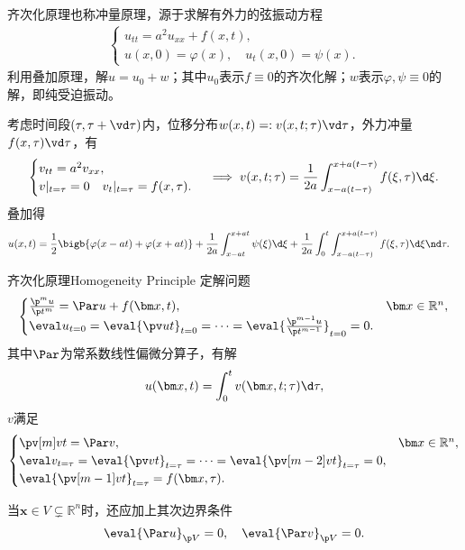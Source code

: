齐次化原理也称冲量原理，源于求解有外力的弦振动方程
\begin{align*}
	\begin{cases}
		u_{tt}=a^2u_{xx}+f(x,t),\\
		u(x,0)=\varphi(x),\quad u_t(x,0)=\psi(x).
	\end{cases}
\end{align*}
利用叠加原理，解$u=u_0+w$；其中$u_0$表示$f\equiv 0$的齐次化解；$w$表示$\varphi,\psi\equiv 0$的解，即纯受迫振动。

考虑时间段$(\tau,\tau+\vd\tau)$内，位移分布$w(x,t)=:v(x,t;\tau)\vd\tau$，外力冲量$f(x,\tau)\vd\tau$，有
\begin{align*}
	\begin{cases}
			v_{tt}=a^2v_{xx},\\
			v|_{t=\tau}=0\quad v_t|_{t=\tau}=f(x,\tau).
	\end{cases}\implies v(x,t;\tau)=\frac1{2a}\int_{x-a(t-\tau)}^{x+a(t-\tau)}f(\xi,\tau)\d\xi.
\end{align*}
叠加得
\begin{align}
	\begin{aligned}
		u(x,t)= {}&\frac12\bigb{\varphi(x-at)+\varphi(x+at)}+\frac1{2a}\int_{x-at}^{x+at}\psi(\xi)\d\xi+\frac1{2a}\int_0^t\int_{x-a(t-\tau)}^{x+a(t-\tau)}f(\xi,\tau)\d\xi\nd\tau.
	\end{aligned}
\end{align}
\begin{theorem}{齐次化原理}{Homogeneity Principle}
	定解问题
	\begin{align*}
		\begin{cases}
			\frac{\p^mu}{\p t^m}=\Par u+f(\bm x,t),&\bm x\in\mathbb R^n,\\
			\eval u_{t=0}=\eval{\pv ut}_{t=0}=\cdots=\eval{\frac{\p^{m-1}u}{\p t^{m-1}}}_{t=0}=0.
		\end{cases}
	\end{align*}
	其中$\Par$为常系数线性偏微分算子，有解
	\[
		u(\bm x,t)=\int_0^tv(\bm x,t;\tau)\d\tau,
	\]
	$v$满足
	\begin{align*}
		\begin{cases}
			\pv[m]vt=\Par v,&\bm x\in\mathbb R^n,\\
			\eval v_{t=\tau}=\eval{\pv v{t}}_{t=\tau}=\cdots=\eval{\pv[m-2]vt}_{t=\tau}=0, \\
			\eval{\pv[m-1]vt}_{t=\tau}=f(\bm x,\tau).
		\end{cases}
	\end{align*}

	当$\bm x\in V\subsetneq\mathbb R^n$时，还应加上其次边界条件
	\[
		\eval{\Par u}_{\p V}=0,\quad\eval{\Par v}_{\p V}=0.
	\]
\end{theorem}

